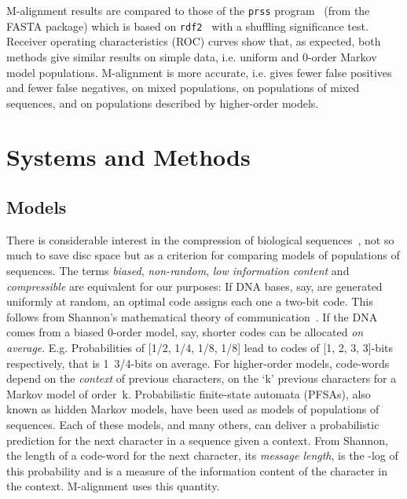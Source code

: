 \documentclass[letterpaper,11pt,oneside]{article}
\begin{document}
M-alignment results are compared to those of
the {\tt prss} program~\cite{smith81} (from the FASTA package) which
is based on {\tt rdf2}~\cite{pearson88} with a shuffling significance test.
Receiver operating characteristics (ROC) curves show that, as expected,
both methods give similar results
on simple data, i.e. uniform and 0-order Markov model populations.
M-alignment is more accurate,
i.e. gives fewer false positives and fewer false negatives,
on mixed populations,
on populations of mixed sequences, and
on populations described by higher-order models.


\section{Systems and Methods} \label{sec:sys}

\subsection{Models} \label{sec:models}

There is considerable interest in the compression of biological
sequences~\cite{grumbach94,lowenstern96,rivals97,allison00},
not so much to save disc space but
as a criterion for comparing models of populations of sequences.
The terms {\em biased}, {\em non-random}, {\em low information content}
and {\em compressible} are equivalent for our purposes:
If DNA bases, say, are generated uniformly at random, an optimal code
assigns each one a two-bit code.
This follows from
Shannon's mathematical theory of communication~\cite{shannon49}.
If the DNA comes from a biased 0-order model, say,
shorter codes can be allocated {\em on average}.
E.g. Probabilities of [1/2, 1/4, 1/8, 1/8] lead to codes of
[1, 2, 3, 3]-bits respectively, that is 1~3/4-bits on average.
For higher-order models, code-words depend on the {\em context}
of previous characters, on the `k' previous characters
for a Markov model of order~k.
Probabilistic finite-state automata (PFSAs),
also known as hidden Markov models,
have been used as models \cite{georgeff84} of populations of sequences.
Each of these models, and many others, can deliver a probabilistic
prediction for the next character in a sequence given a context.
From Shannon, the length of a code-word for the next character,
its {\em message length}, is the -log of this probability and
is a measure of the information content of the character in the context.
M-alignment uses this quantity.
\end{document}
